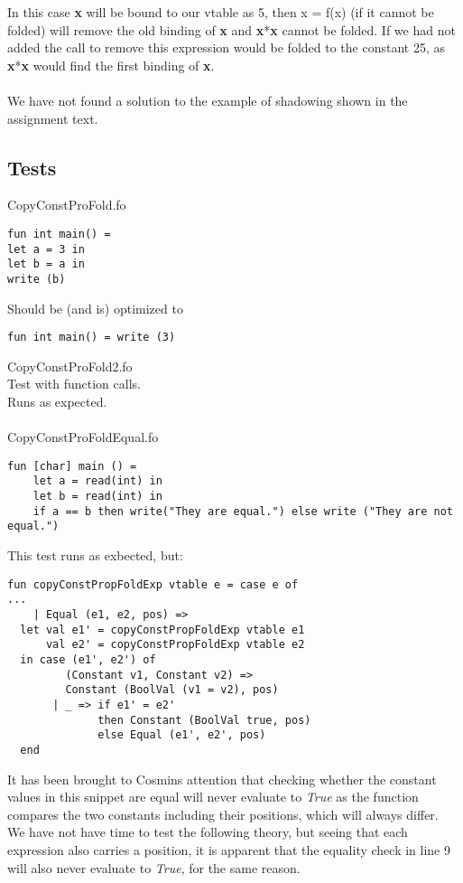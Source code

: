 \documentclass{article}
\begin{document}
\noindent In this case \textbf{x} will be bound to our vtable as 5, then x = f(x) (if it cannot be folded) will remove the old binding of \textbf{x} and \textbf{x}*\textbf{x} cannot be folded. If we had not added the call to remove this expression would be folded to the constant 25, as \textbf{x}*\textbf{x} would find the first binding of \textbf{x}.\\
\\
We have not found a solution to the example of shadowing shown in the assignment text.

\subsection{Tests}
CopyConstProFold.fo
\begin{lstlisting}
fun int main() =
let a = 3 in
let b = a in
write (b)
\end{lstlisting}
\noindent Should be (and is) optimized to
\begin{lstlisting}
fun int main() = write (3)
\end{lstlisting}
CopyConstProFold2.fo\\
Test with function calls.\\
Runs as expected.\\
\\
CopyConstProFoldEqual.fo\\
\begin{lstlisting}
fun [char] main () = 
    let a = read(int) in
    let b = read(int) in
    if a == b then write("They are equal.") else write ("They are not equal.")
\end{lstlisting}
This test runs as exbected, but:\\
\begin{lstlisting}
fun copyConstPropFoldExp vtable e = case e of
...
    | Equal (e1, e2, pos) =>
  let val e1' = copyConstPropFoldExp vtable e1
      val e2' = copyConstPropFoldExp vtable e2
  in case (e1', e2') of
         (Constant v1, Constant v2) =>
         Constant (BoolVal (v1 = v2), pos)
       | _ => if e1' = e2'
              then Constant (BoolVal true, pos)
              else Equal (e1', e2', pos)
  end
\end{lstlisting}
It has been brought to Cosmins attention that checking whether the constant values in this snippet are equal will never evaluate to \textit{True} as the function compares the two constants including their positions, which will always differ.\\
We have not have time to test the following theory, but seeing that each expression also carries a position, it is apparent that the equality check in line 9 will also never evaluate to \textit{True}, for the same reason.\\
\end{document}
